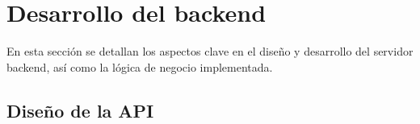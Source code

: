 





\section{Desarrollo del backend}

En esta sección se detallan los aspectos clave en el diseño y desarrollo del
servidor backend, así como la lógica de negocio implementada.

\subsection{Diseño de la API}


